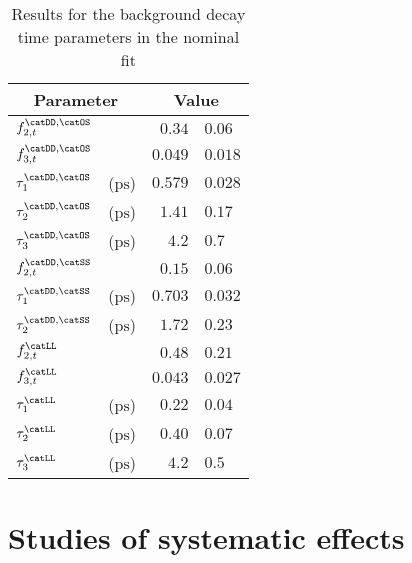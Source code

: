 \begin{table}
  \caption{Results for the background decay time parameters in the nominal fit}
  \label{tab:app:measurement_of_sin2beta:cpv_measurement:results:time:bkg}
  \centering
  \begin{tabular}{llr@{$\,\pm\,$}l}
      \toprule
      \multicolumn{2}{c}{Parameter}       & \multicolumn{2}{c}{Value}                  \\
      \midrule
      $f^{\catDD,\catOS}_{2,t}$   &                       & $0.34$    & $0.06$   \\
      $f^{\catDD,\catOS}_{3,t}$   &                       & $0.049$   & $0.018$  \\
      $\tau^{\catDD,\catOS}_{1}$  & ($\si{\pico\second}$) & $0.579$   & $0.028$  \\
      $\tau^{\catDD,\catOS}_{2}$  & ($\si{\pico\second}$) & $1.41$    & $0.17$   \\
      $\tau^{\catDD,\catOS}_{3}$  & ($\si{\pico\second}$) & $4.2$     & $0.7$    \\
      \midrule
      $f^{\catDD,\catSS}_{2,t}$   &                       & $0.15$    & $0.06$   \\
      $\tau^{\catDD,\catSS}_{1}$  & ($\si{\pico\second}$) & $0.703$   & $0.032$   \\
      $\tau^{\catDD,\catSS}_{2}$  & ($\si{\pico\second}$) & $1.72$    & $0.23$   \\
      \midrule
      $f^{\catLL}_{2,t}$          &                       & $0.48$    & $0.21$   \\
      $f^{\catLL}_{3,t}$          &                       & $0.043$   & $0.027$  \\
      $\tau^{\catLL}_{1}$         & ($\si{\pico\second}$) & $0.22$    & $0.04$  \\
      $\tau^{\catLL}_{2}$         & ($\si{\pico\second}$) & $0.40$    & $0.07$   \\
      $\tau^{\catLL}_{3}$         & ($\si{\pico\second}$) & $4.2$     & $0.5$    \\
      \bottomrule
    \end{tabular}
\end{table}

\FloatBarrier
\section{Studies of systematic effects}
\label{sec:app:measurement_of_sin2beta:systematics}

